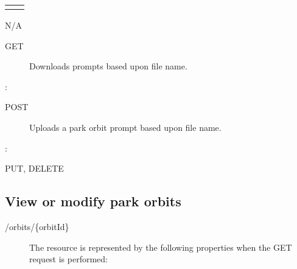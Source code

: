 \documentclass[letterpaper,10pt,english]{sphinxmanual}
\begin{document}
\begin{savenotes}\sphinxattablestart
\centering
\begin{tabulary}{\linewidth}[t]{|T|T|}
\hline

&
\\
\hline&\\
\hline
\end{tabulary}
\par
\sphinxattableend\end{savenotes}

 N/A
\begin{description}
\item[{ GET}] \leavevmode
Downloads prompts based upon file name.

\end{description}

:

\begin{sphinxVerbatim}[commandchars=\\\{\}]
\end{sphinxVerbatim}
\begin{description}
\item[{ POST}] \leavevmode
Uploads a park orbit prompt based upon file name.

\end{description}

:

\begin{sphinxVerbatim}[commandchars=\\\{\}]
\end{sphinxVerbatim}

 PUT, DELETE


\subsection{View or modify park orbits}
\label{\detokenize{restapi:view-or-modify-park-orbits}}
 /orbits/\{orbitId\}
\begin{description}
\item[{}] \leavevmode
The resource is represented by the following properties when the GET request is performed:

\end{description}
\end{document}
